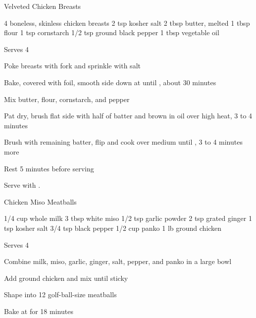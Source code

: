 \begin{denserecipe}{Velveted Chicken Breasts}{}
\begin{ingredients}
4 boneless, skinless \ibreak chicken breasts
2 tsp kosher salt
2 tbsp butter, melted
1 tbsp flour
1 tsp cornstarch
1/2 tsp ground black \ibreak pepper
1 tbsp vegetable oil
\end{ingredients}
\nextcolumn
Serves 4
\begin{steps}
    \item Poke breasts with fork and sprinkle with salt
    \item Bake, covered with foil, smooth side down at  until , about 30 minutes
    \item Mix butter, flour, cornstarch, and pepper
    \item Pat dry, brush flat side with half of batter and brown in oil over high heat, 3 to 4 minutes
    \item Brush with remaining batter, flip and cook over medium until , 3 to 4 minutes more
    \item Rest 5 minutes before serving
\end{steps}
Serve with .
\end{denserecipe}

\begin{recipe}{Chicken Miso Meatballs}{}
\begin{ingredients}
1/4 cup whole milk
3 tbsp white miso
1/2 tsp garlic powder
2 tsp grated ginger
1 tsp kosher salt
3/4 tsp black pepper
1/2 cup panko
1 lb ground chicken
\end{ingredients}
\nextcolumn
Serves 4
\begin{steps}
    \item Combine milk, miso, garlic, ginger, salt, pepper, and panko in a large bowl
    \item Add ground chicken and mix until sticky
    \item Shape into 12 golf-ball-size meatballs
    \item Bake at  for 18 minutes
\end{steps}
\end{recipe}

